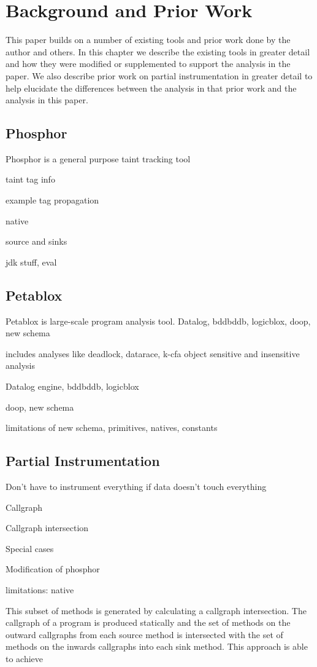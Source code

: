 \chapter{Background and Prior Work}
This paper builds on a number of existing tools and prior work done by the author and others. In this chapter we describe the existing tools in greater detail and how they were modified or supplemented to support the analysis in the paper. We also describe prior work on partial instrumentation in greater detail to help elucidate the differences between the analysis in that prior work and the analysis in this paper.
\section{Phosphor}
Phosphor is a general purpose taint tracking tool

taint tag info

example tag propagation

native

source and sinks

jdk stuff, eval
\section{Petablox}
Petablox is large-scale program analysis tool. Datalog, bddbddb, logicblox, doop, new schema

includes analyses like deadlock, datarace, k-cfa object sensitive and insensitive analysis

Datalog engine, bddbddb, logicblox

doop, new schema

limitations of new schema, primitives, natives, constants
\section{Partial Instrumentation}
Don't have to instrument everything if data doesn't touch everything

Callgraph

Callgraph intersection

Special cases

Modification of phosphor

limitations: native

This subset of methods is generated by calculating a callgraph intersection. The callgraph of a program is produced statically and the set of methods on the outward callgraphs from each source method is intersected with the set of methods on the inwards callgraphs into each sink method. This approach is able to achieve 

